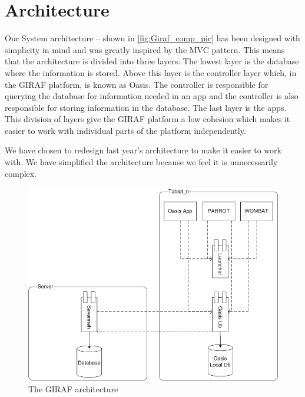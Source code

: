 \section{Architecture}
Our System architecture -- shown in \autoref{fig:Giraf_comp_pic} has been designed with simplicity in mind and was greatly inspired by the MVC pattern. This means that the architecture is divided into three layers. The lowest layer is the database where the information is stored. Above this layer is the controller layer which, in the GIRAF platform, is known as Oasis. The controller is responsible for querying the database for information needed in an app and the controller is also responsible for storing information in the database. The last layer is the apps. This division of layers give the GIRAF platform a low cohesion which makes it easier to work with individual parts of the platform independently.

We have chosen to redesign last year's architecture \cite{LastYearsArchitecture} to make it easier to work with. We have simplified the architecture because we feel it is unnecessarily complex.

\begin{figure}[H]
	\centering
		\includegraphics[width=\textwidth]{Images/Giraf_comp.png}
	\caption{The GIRAF architecture}
	\label{fig:Giraf_comp_pic}
\end{figure}

\pagebreak